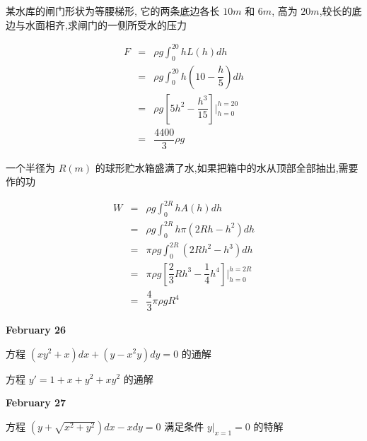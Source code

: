 \begin{example}[][Exam: 28.4.7]
	某水库的闸门形状为等腰梯形, 它的两条底边各长 $10m$ 和 $6m$, 高为 $20m$,较长的底边与水面相齐,求闸门的一侧所受水的压力
\end{example}
\begin{solution}
	\begin{eqnarray*}
		F & = & \rho g\int_{0}^{20}hL(h)dh\\
		  & = & \rho g\int_{0}^{20}h(10-\dfrac{h}{5})dh\\
		  & = & \rho g \left[5h^{2}-\dfrac{h^{3}}{15}\right]\big|_{h=0}^{h=20}\\
		  & = & \dfrac{4400}{3}\rho g
	\end{eqnarray*}
\end{solution}

\begin{example}[][Exam: 28.4.8]
	一个半径为 $R(m)$ 的球形贮水箱盛满了水,如果把箱中的水从顶部全部抽出,需要作的功
\end{example}
\begin{solution}
	\begin{eqnarray*}
		W & = & \rho g\int_{0}^{2R}h A(h)dh\\
		  & = & \rho g\int_{0}^{2R}h\pi (2Rh-h^{2})dh\\
		  & = & \pi \rho g \int_{0}^{2R}(2Rh^{2}-h^{3})dh\\
		  & = & \pi \rho g \left[\dfrac{2}{3}Rh^{3}-\dfrac{1}{4}h^{4}\right]\big|_{h=0}^{h=2R}\\
		  & = & \dfrac{4}{3}\pi \rho g R^{4}
	\end{eqnarray*}
\end{solution}

\textcolor{purplea}{\textbf{February 26}}

\begin{example}[][Exam: 28.4.9]
	方程 $(xy^{2}+x)dx+(y-x^{2}y)dy=0$ 的通解
\end{example}
\begin{solution}

\end{solution}
\begin{example}[][Exam: 28.4.10]
	方程 $y'=1+x+y^{2}+xy^{2}$ 的通解
\end{example}
\begin{solution}
\end{solution}

\textcolor{purplea}{\textbf{February 27}}

\begin{example}[][Exam: 28.4.11]
	方程 $(y+\sqrt{x^{2}+y^{2}})dx-xdy=0$ 满足条件 $y|_{x=1}=0$ 的特解
\end{example}

